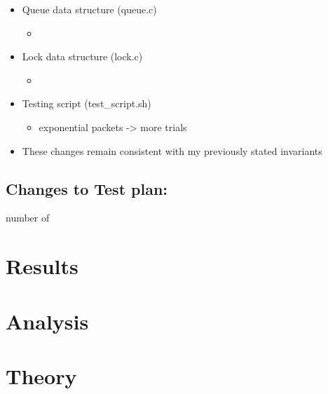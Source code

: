 \documentclass[]{article}
\begin{document}
\begin{itemize}
\begin{itemize}
	\end{itemize}
	\item Queue data structure (queue.c)
	\begin{itemize}
		\item 
	\end{itemize}
	\item Lock data structure (lock.c)
	\begin{itemize}
		\item 
	\end{itemize}
	\item Testing script (test\_script.sh)
	\begin{itemize}
		\item exponential packets -> more trials
	\end{itemize}
	\item These changes remain consistent with my previously stated invariants
\end{itemize}

\subsection{Changes to Test plan:}

number of 

\section{Results}

\section{Analysis}

\section{Theory}
	
\end{document}
